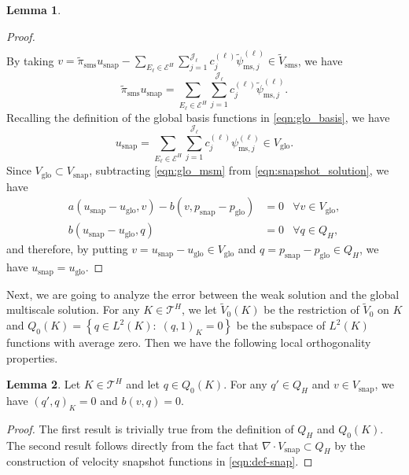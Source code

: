 \documentclass{article}[11pt]
\theoremstyle{definition}
\newtheorem{lemma}{Lemma}[section]
\begin{document}
\begin{lemma}
\begin{proof}
\[\begin{split}
\end{split}
\]
By taking $v = \tilde{\pi}_{\text{sms}} u_{\text{snap}} - \sum_{E_\ell \in \mathcal{E}^H} \sum_{j=1}^{\mathcal{J}_\ell} c_{j}^{(\ell)} \tilde \psi_{\text{ms},j}^{(\ell)} \in \tilde{V}_{\text{sms}}$, 
we have  
\begin{equation}
\tilde{\pi}_{\text{sms}} u_{\text{snap}} = \sum_{E_\ell \in \mathcal{E}^H} \sum_{j=1}^{\mathcal{J}_\ell} 
c_{j}^{(\ell)} \tilde \psi_{\text{ms},j}^{(\ell)}. 
\end{equation}
Recalling the definition of the global basis functions in \eqref{eqn:glo_basis}, we have 
\begin{equation}
u_{\text{snap}} = \sum_{E_\ell \in \mathcal{E}^H} \sum_{j=1}^{\mathcal{J}_\ell} 
c_{j}^{(\ell)} \psi_{\text{ms},j}^{(\ell)} \in V_{\text{glo}}. 
\end{equation}
Since $V_{\text{glo}}\subset V_{\text{snap}}$, 
subtracting \eqref{eqn:glo_msm} from \eqref{eqn:snapshot_solution}, 
we have
\begin{equation}
\begin{aligned}
a(u_{\text{snap}}-u_{\text{glo}},v)-b(v,p_{\text{snap}}-p_{\text{glo}}) & =0 & \forall v\in V_{\text{glo}},\\
b(u_{\text{snap}}-u_{\text{glo}},q) & =0 & \forall  q\in Q_{H},
\end{aligned}
\end{equation}
and therefore, by putting $v=u_{\text{snap}}-u_{\text{glo}} \in V_{\text{glo}}$ and $q=p_{\text{snap}}-p_{\text{glo}} \in Q_H$, we have $u_{\text{snap}}=u_{\text{glo}}$.
\end{proof}
\end{lemma}

Next, we are going to analyze the error between the weak solution 
and the global multiscale solution. 
For any $K \in \mathcal{T}^H$, we let 
$\tilde{V}_0(K)$ be the restriction of $\tilde{V}_0$ on $K$ and 
$Q_0(K) = \left\{ q \in L^2(K): \; (q,1)_K = 0 \right\}$ 
be the subspace of $L^2(K)$ functions with average zero.
Then we have the following local orthogonality properties.
\begin{lemma}\label{lemma:ortho-2}
Let $K \in \mathcal{T}^H$ and let $q \in Q_0(K)$. 
For any $q' \in Q_H$ and $v \in V_{\text{snap}}$, we have $(q', q)_K = 0$ and $b(v,q) = 0$. 
\begin{proof}
The first result is trivially true from the definition of $Q_H$ and $Q_0(K)$. 
The second result follows directly from the fact that $\nabla \cdot V_{\text{snap}} \subset Q_H$ by the construction of velocity snapshot functions in \eqref{eqn:def-snap}. 
\end{proof}
\end{lemma}
\end{document}
